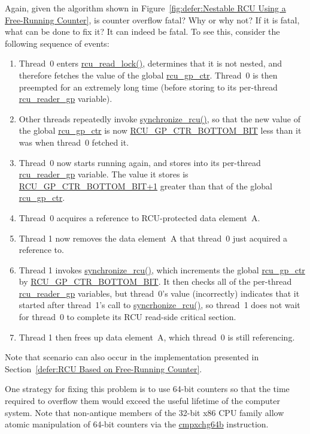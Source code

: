 \QuickQ{}
	Again, given the algorithm shown in
	Figure~\ref{fig:defer:Nestable RCU Using a Free-Running Counter},
	is counter overflow fatal?
	Why or why not?
	If it is fatal, what can be done to fix it?
\QuickA{}
	It can indeed be fatal.
	To see this, consider the following sequence of events:
	\begin{enumerate}
	\item	Thread~0 enters \url{rcu_read_lock()}, determines
		that it is not nested, and therefore fetches the
		value of the global \url{rcu_gp_ctr}.
		Thread~0 is then preempted for an extremely long time
		(before storing to its per-thread \url{rcu_reader_gp}
		variable).
	\item	Other threads repeatedly invoke \url{synchronize_rcu()},
		so that the new value of the global \url{rcu_gp_ctr}
		is now \url{RCU_GP_CTR_BOTTOM_BIT}
		less than it was when thread~0 fetched it.
	\item	Thread~0 now starts running again, and stores into
		its per-thread \url{rcu_reader_gp} variable.
		The value it stores is
		\url{RCU_GP_CTR_BOTTOM_BIT+1}
		greater than that of the global \url{rcu_gp_ctr}.
	\item	Thread~0 acquires a reference to RCU-protected data
		element~A.
	\item	Thread 1 now removes the data element~A that thread~0
		just acquired a reference to.
	\item	Thread 1 invokes \url{synchronize_rcu()}, which
		increments the global \url{rcu_gp_ctr} by
		\url{RCU_GP_CTR_BOTTOM_BIT}.
		It then checks all of the per-thread \url{rcu_reader_gp}
		variables, but thread~0's value (incorrectly) indicates
		that it started after thread~1's call to
		\url{syncrhonize_rcu()}, so thread~1 does not wait
		for thread~0 to complete its RCU read-side critical
		section.
	\item	Thread 1 then frees up data element~A, which thread~0
		is still referencing.
	\end{enumerate}

	Note that scenario can also occur in the implementation presented in
	Section~\ref{defer:RCU Based on Free-Running Counter}.

	One strategy for fixing this problem is to use 64-bit
	counters so that the time required to overflow them would exceed
	the useful lifetime of the computer system.
	Note that non-antique members of the 32-bit x86 CPU family
	allow atomic manipulation of 64-bit counters via the
	\url{cmpxchg64b} instruction.

